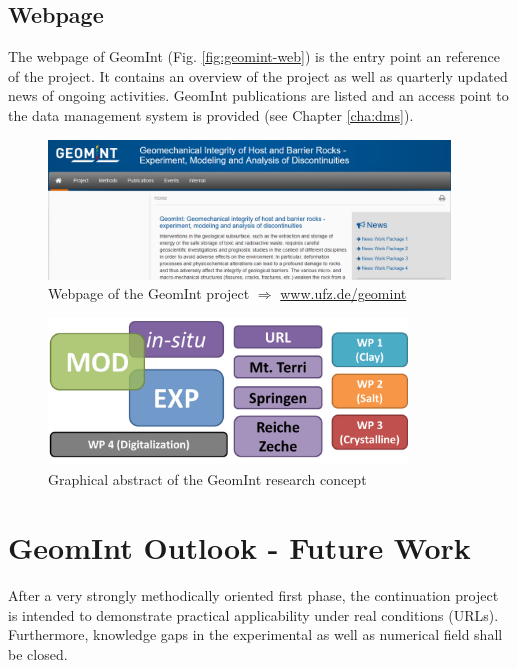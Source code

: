 \subsection*{Webpage}

The webpage of GeomInt (Fig. \ref{fig:geomint-web}) is the entry point an reference of the project. It contains an overview of the project as well as quarterly updated news of ongoing activities. GeomInt publications are listed and an access point to the data management system is provided (see Chapter \ref{cha:dms}).

\begin{figure}[ht!]
\centering
\includegraphics[width=0.95\textwidth]{figures/geomint-web.png}
\caption{Webpage of the GeomInt project $\Rightarrow$ \url{www.ufz.de/geomint}}
\label{fig:syn-geomint-web}
\end{figure}

\begin{figure}[ht!]
\centering
\includegraphics[width=0.85\textwidth]{figures/geomint2.png}
\caption{Graphical abstract of the GeomInt research concept}
\label{fig:geomint2}
\end{figure}

\section{GeomInt Outlook - Future Work}

After a very strongly methodically oriented first phase, the continuation project is intended to demonstrate practical applicability under real conditions (URLs). Furthermore, knowledge gaps in the experimental as well as numerical field shall be closed.

